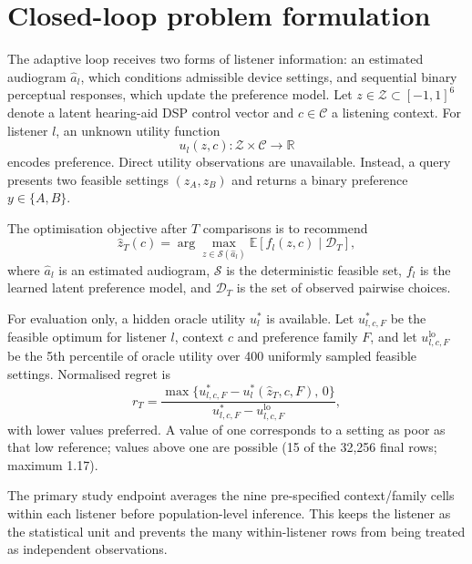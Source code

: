 \documentclass[preprint,12pt]{elsarticle}
\begin{document}
\section{Closed-loop problem formulation}
\label{sec:problem}

The adaptive loop receives two forms of listener information: an estimated audiogram $\hat a_l$, which conditions admissible device settings, and sequential binary perceptual responses, which update the preference model. Let $z\in\mathcal Z\subset[-1,1]^6$ denote a latent hearing-aid DSP control vector and $c\in\mathcal C$ a listening context. For listener $l$, an unknown utility function
\begin{equation}
    u_l(z,c):\mathcal Z\times\mathcal C\rightarrow\mathbb R
\end{equation}
encodes preference. Direct utility observations are unavailable. Instead, a query presents two feasible settings $(z_A,z_B)$ and returns a binary preference $y\in\{A,B\}$.

The optimisation objective after $T$ comparisons is to recommend
\begin{equation}
    \hat z_T(c)=\arg\max_{z\in\mathcal S(\hat a_l)} \mathbb E[f_l(z,c)\mid\mathcal D_T],
    \label{eq:recommend}
\end{equation}
where $\hat a_l$ is an estimated audiogram, $\mathcal S$ is the deterministic feasible set, $f_l$ is the learned latent preference model, and $\mathcal D_T$ is the set of observed pairwise choices.

For evaluation only, a hidden oracle utility $u_l^*$ is available. Let $u^*_{l,c,F}$ be the feasible optimum for listener $l$, context $c$ and preference family $F$, and let $u^{\mathrm{lo}}_{l,c,F}$ be the 5th percentile of oracle utility over 400 uniformly sampled feasible settings. Normalised regret is
\begin{equation}
    r_T = \frac{\max\{u^*_{l,c,F}-u_l^*(\hat z_T,c,F),\,0\}}{u^*_{l,c,F}-u^{\mathrm{lo}}_{l,c,F}},
    \label{eq:regret}
\end{equation}
with lower values preferred. A value of one corresponds to a setting as poor as that low reference; values above one are possible (15 of the 32,256 final rows; maximum 1.17).

The primary study endpoint averages the nine pre-specified context/family cells within each listener before population-level inference. This keeps the listener as the statistical unit and prevents the many within-listener rows from being treated as independent observations.
\end{document}
